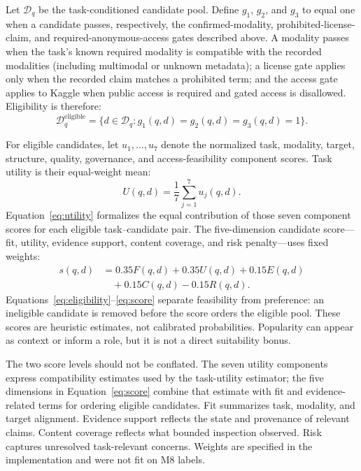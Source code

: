 \documentclass[conference]{IEEEtran}
\begin{document}
Let $\mathcal{D}_q$ be the task-conditioned candidate pool. Define $g_1$, $g_2$, and $g_3$ to equal one when a candidate passes, respectively, the confirmed-modality, prohibited-license-claim, and required-anonymous-access gates described above. A modality passes when the task's known required modality is compatible with the recorded modalities (including multimodal or unknown metadata); a license gate applies only when the recorded claim matches a prohibited term; and the access gate applies to Kaggle when public access is required and gated access is disallowed. Eligibility is therefore:
\begin{equation}
\mathcal{D}_q^{\mathrm{eligible}} =
\{d\in\mathcal{D}_q: g_1(q,d)=g_2(q,d)=g_3(q,d)=1\}.
\label{eq:eligibility}
\end{equation}

For eligible candidates, let $u_1,\ldots,u_7$ denote the normalized task, modality, target, structure, quality, governance, and access-feasibility component scores. Task utility is their equal-weight mean:
\begin{equation}
U(q,d)=\frac{1}{7}\sum_{j=1}^{7}u_j(q,d).
\label{eq:utility}
\end{equation}
Equation~\ref{eq:utility} formalizes the equal contribution of those seven component scores for each eligible task--candidate pair.
The five-dimension candidate score---fit, utility, evidence support, content coverage, and risk penalty---uses fixed weights:
\begin{equation}
\begin{aligned}
 s(q,d) &= 0.35F(q,d)+0.35U(q,d)+0.15E(q,d)\\
         &\quad +0.15C(q,d)-0.15R(q,d).
\end{aligned}
\label{eq:score}
\end{equation}
Equations~\ref{eq:eligibility}--\ref{eq:score} separate feasibility from preference: an ineligible candidate is removed before the score orders the eligible pool. These scores are heuristic estimates, not calibrated probabilities. Popularity can appear as context or inform a role, but it is not a direct suitability bonus.

The two score levels should not be conflated. The seven utility components express compatibility estimates used by the task-utility estimator; the five dimensions in Equation~\ref{eq:score} combine that estimate with fit and evidence-related terms for ordering eligible candidates. Fit summarizes task, modality, and target alignment. Evidence support reflects the state and provenance of relevant claims. Content coverage reflects what bounded inspection observed. Risk captures unresolved task-relevant concerns. Weights are specified in the implementation and were not fit on M8 labels.
\end{document}
